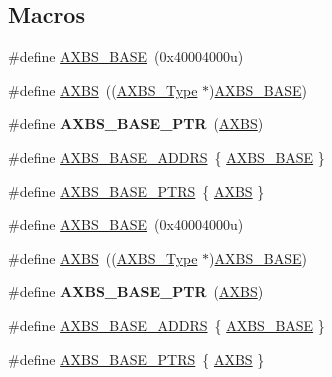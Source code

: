 \subsection*{Macros}
\begin{DoxyCompactItemize}
\item 
\#define \hyperlink{group__AXBS__Peripheral__Access__Layer_ga99fb6b20345e6deac58c537b7c30680b}{A\+X\+B\+S\+\_\+\+B\+A\+SE}~(0x40004000u)
\item 
\#define \hyperlink{group__AXBS__Peripheral__Access__Layer_gaa1f873165d665725d94cd2615e37daf5}{A\+X\+BS}~((\hyperlink{structAXBS__Type}{A\+X\+B\+S\+\_\+\+Type} $\ast$)\hyperlink{group__AXBS__Peripheral__Access__Layer_ga99fb6b20345e6deac58c537b7c30680b}{A\+X\+B\+S\+\_\+\+B\+A\+SE})
\item 
\#define {\bfseries A\+X\+B\+S\+\_\+\+B\+A\+S\+E\+\_\+\+P\+TR}~(\hyperlink{group__AXBS__Peripheral__Access__Layer_gaa1f873165d665725d94cd2615e37daf5}{A\+X\+BS})\hypertarget{group__AXBS__Peripheral__Access__Layer_gacbbf56489b86d1ddb3e0ac291922a56d}{}\label{group__AXBS__Peripheral__Access__Layer_gacbbf56489b86d1ddb3e0ac291922a56d}

\item 
\#define \hyperlink{group__AXBS__Peripheral__Access__Layer_ga401a7e5a8976f1312fd3dcf0ffd7f45e}{A\+X\+B\+S\+\_\+\+B\+A\+S\+E\+\_\+\+A\+D\+D\+RS}~\{ \hyperlink{group__AXBS__Peripheral__Access__Layer_ga99fb6b20345e6deac58c537b7c30680b}{A\+X\+B\+S\+\_\+\+B\+A\+SE} \}
\item 
\#define \hyperlink{group__AXBS__Peripheral__Access__Layer_ga522ab97d5ed3e73f1cb3591c40ecc50e}{A\+X\+B\+S\+\_\+\+B\+A\+S\+E\+\_\+\+P\+T\+RS}~\{ \hyperlink{group__AXBS__Peripheral__Access__Layer_gaa1f873165d665725d94cd2615e37daf5}{A\+X\+BS} \}
\item 
\#define \hyperlink{group__AXBS__Peripheral__Access__Layer_ga99fb6b20345e6deac58c537b7c30680b}{A\+X\+B\+S\+\_\+\+B\+A\+SE}~(0x40004000u)
\item 
\#define \hyperlink{group__AXBS__Peripheral__Access__Layer_gaa1f873165d665725d94cd2615e37daf5}{A\+X\+BS}~((\hyperlink{structAXBS__Type}{A\+X\+B\+S\+\_\+\+Type} $\ast$)\hyperlink{group__AXBS__Peripheral__Access__Layer_ga99fb6b20345e6deac58c537b7c30680b}{A\+X\+B\+S\+\_\+\+B\+A\+SE})
\item 
\#define {\bfseries A\+X\+B\+S\+\_\+\+B\+A\+S\+E\+\_\+\+P\+TR}~(\hyperlink{group__AXBS__Peripheral__Access__Layer_gaa1f873165d665725d94cd2615e37daf5}{A\+X\+BS})\hypertarget{group__AXBS__Peripheral__Access__Layer_gacbbf56489b86d1ddb3e0ac291922a56d}{}\label{group__AXBS__Peripheral__Access__Layer_gacbbf56489b86d1ddb3e0ac291922a56d}

\item 
\#define \hyperlink{group__AXBS__Peripheral__Access__Layer_ga401a7e5a8976f1312fd3dcf0ffd7f45e}{A\+X\+B\+S\+\_\+\+B\+A\+S\+E\+\_\+\+A\+D\+D\+RS}~\{ \hyperlink{group__AXBS__Peripheral__Access__Layer_ga99fb6b20345e6deac58c537b7c30680b}{A\+X\+B\+S\+\_\+\+B\+A\+SE} \}
\item 
\#define \hyperlink{group__AXBS__Peripheral__Access__Layer_ga522ab97d5ed3e73f1cb3591c40ecc50e}{A\+X\+B\+S\+\_\+\+B\+A\+S\+E\+\_\+\+P\+T\+RS}~\{ \hyperlink{group__AXBS__Peripheral__Access__Layer_gaa1f873165d665725d94cd2615e37daf5}{A\+X\+BS} \}
\end{DoxyCompactItemize}
